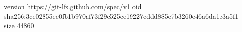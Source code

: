 version https://git-lfs.github.com/spec/v1
oid sha256:3ce02855ee0fb1b970af73f29c525ce19227cddd885e7b3260e46a6da1e3a5f1
size 44860
